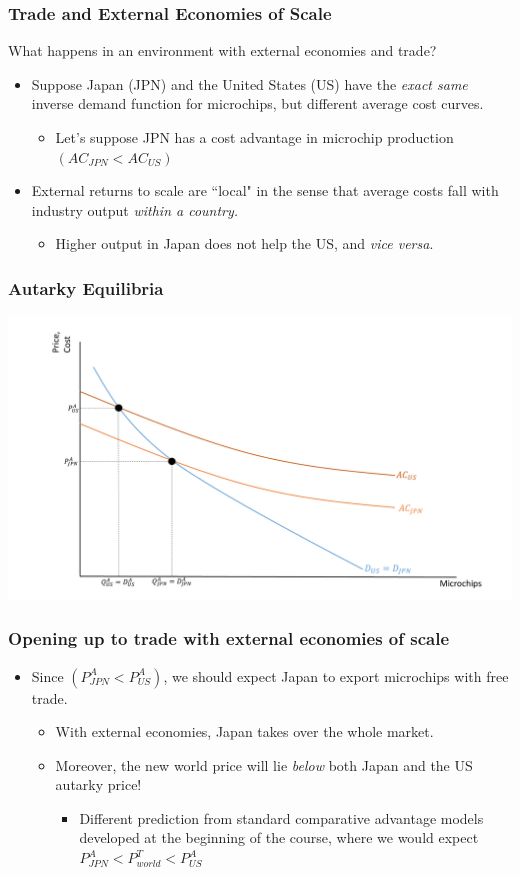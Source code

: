 \documentclass{beamer}
\begin{document}
\begin{frame}
	\frametitle{Trade and External Economies of Scale}
What happens in an environment with external economies and trade?
	\begin{itemize}
		\item Suppose Japan (JPN) and the United States (US)  have the \emph{exact same} inverse demand function for microchips, but different average cost curves.
			\begin{itemize}
				\item Let's suppose JPN has a cost advantage in microchip production $(AC_{JPN}<AC_{US})$
			\end{itemize}
		\item External returns to scale are ``local" in the sense that average costs fall with industry output \emph{within a country.}
			\begin{itemize}
				\item Higher output in Japan does not help the US, and \emph{vice versa}.
			\end{itemize}
	\end{itemize}
\end{frame}

\begin{frame}
	\frametitle{Autarky Equilibria}
	\includegraphics[scale=0.32]{SL4_18.pdf}
\end{frame}

\begin{frame}
	\frametitle{Opening up to trade with external economies of scale}
	\begin{itemize}
		\item Since $(P^A_{JPN}<P^A_{US})$, we should expect Japan to export microchips with free trade.
			\begin{itemize}
				\item With external economies, Japan takes over the whole market.
				\item Moreover, the new world price will lie \emph{below} both Japan and the US autarky price!
					\begin{itemize}
						\item Different prediction from standard comparative advantage models developed at the beginning of the course, where we would expect $P^A_{JPN}<P^T_{world}<P^A_{US}$ 
					\end{itemize}
			\end{itemize}
	\end{itemize}
\end{frame}
\end{document}
